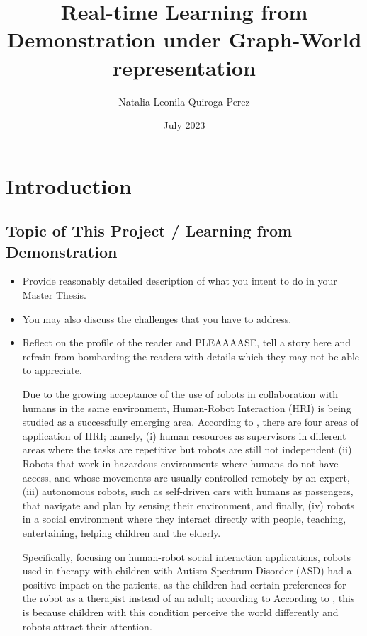 \documentclass[thesis]{mas_proposal}
\title{Real-time Learning from Demonstration under Graph-World representation}
\author{Natalia Leonila Quiroga Perez}
\date{July 2023}
\begin{document}
\maketitle

\pagestyle{plain}

\section{Introduction}

\subsection{Topic of This  Project / Learning from Demonstration }
\begin{itemize}
    \item Provide reasonably detailed description of what you intent to do in your Master Thesis.
    \item You may also discuss the challenges that you have to address.
    \item Reflect on the profile of the reader and PLEAAAASE, tell a story here and refrain from bombarding the readers with details which they may not be able to appreciate.

    Due to the growing acceptance of the use of robots in collaboration with humans in the same environment, Human-Robot Interaction (HRI) is being studied as a successfully emerging area. According to \cite{sheridan2016}, there are four areas of application of HRI; namely, (i) human resources as supervisors in different areas where the tasks are repetitive but robots are still not independent (ii) Robots that work in hazardous environments where humans do not have access, and whose movements are usually controlled remotely by an expert, (iii) autonomous robots, such as self-driven cars with humans as passengers, that navigate and plan by sensing their environment, and finally, (iv) robots in a social environment where they interact directly with people, teaching, entertaining, helping children and the elderly.
    
    Specifically, focusing on human-robot social interaction applications, robots used in therapy with children with Autism Spectrum Disorder (ASD) had a positive impact on the patients, as the children had certain preferences for the robot as a therapist instead of an adult; according to  According to \cite{prabha2019}, this is because children with this condition perceive the world differently and robots attract their attention.
    

\end{itemize}
\end{document}

